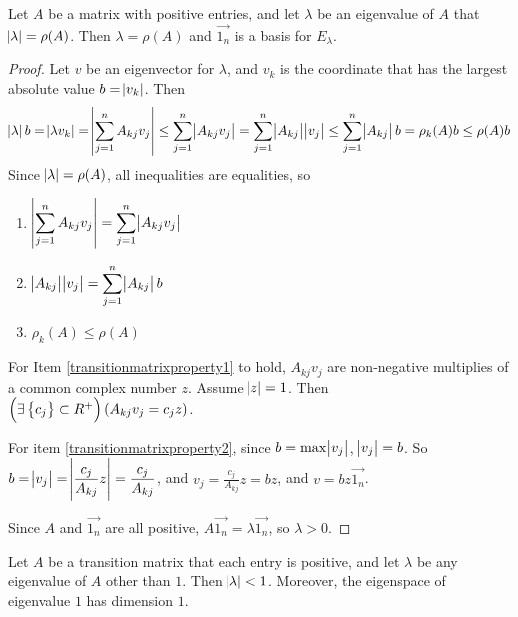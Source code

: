 \begin{theorem}
    Let $A$ be a matrix with positive entries, and let $\lambda$ be an eigenvalue of $A$ that $\abs{\lambda} = \rho(A)$. Then $\lambda = \rho(A)$ and $\vec{1_n}$ is a basis for $E_\lambda$.
\end{theorem}
\begin{proof}
    Let $v$ be an eigenvector for $\lambda$, and $v_k$ is the coordinate that has the largest absolute value $b = \abs{v_k}$. Then
    \begin{equation*}
        \abs{\lambda} b = \abs{\lambda v_k} = \abs{\sum_{j=1}^n A_{kj} v_j} \leq \sum_{j=1}^n \abs{A_{kj} v_j} = \sum_{j=1}^n \abs{A_{kj}} \abs{v_j} \leq \sum_{j=1}^n \abs{A_{kj}} b = \rho_k(A) b \leq \rho(A) b
    \end{equation*}
    Since $\abs{\lambda} = \rho(A)$, all inequalities are equalities, so
    \begin{enumerate}
        \item \label{transitionmatrixproperty1}$\displaystyle \abs{\sum_{j=1}^n A_{kj} v_j} = \sum_{j=1}^n \abs{A_{kj} v_j}$
        \item \label{transitionmatrixproperty2}$\displaystyle \abs{A_{kj}} \abs{v_j} = \sum_{j=1}^n \abs{A_{kj}} b$
        \item \label{transitionmatrixproperty3}$\rho_k(A) \leq \rho(A)$
    \end{enumerate}
    
    For Item \ref{transitionmatrixproperty1} to hold, $A_{kj} v_j$ are non-negative multiplies of a common complex number $z$. Assume $\abs{z}=1$. Then $\left(\exists \set{c_j} \subset R^+ \right) (A_{kj} v_j = c_j z)$.
    
    For item \ref{transitionmatrixproperty2}, since $b = \max \abs{v_j}$, $\abs{v_j} = b$. So $\displaystyle b = \abs{v_j} = \abs{\frac{c_j}{A_{kj}} z} = \frac{c_j}{A_{kj}}$, and $\displaystyle v_j = \frac{c_j}{A_{kj}} z = bz$, and $v = bz \vec{1_n}$.
    
    Since $A$ and $\vec{1_n}$ are all positive, $A \vec{1_n} = \lambda \vec{1_n}$, so $\lambda > 0$.
\end{proof}

\begin{theorem}
    Let $A$ be a transition matrix that each entry is positive, and let $\lambda$ be any eigenvalue of $A$ other than $1$. Then $\abs{\lambda} < 1$. Moreover, the eigenspace of eigenvalue $1$ has dimension $1$.
\end{theorem}

